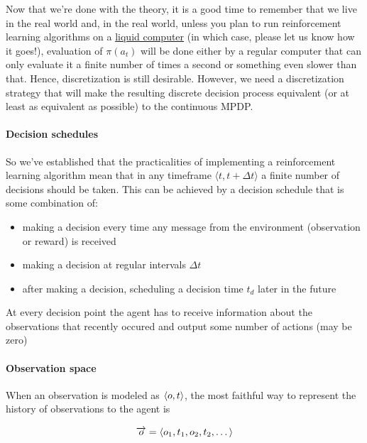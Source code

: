 Now that we're done with the theory, it is a good time to remember that
we live in the real world and, in the real world, unless you plan to run
reinforcement learning algorithms on a
\href{https://royalsocietypublishing.org/doi/10.1098/rstb.2018.0372}{liquid
computer} (in which case, please let us know how it goes!), evaluation
of $\pi(a_t)$ will be done
either by a regular computer that can only evaluate it a finite number
of times a second or something even slower than that. Hence,
discretization is still desirable. However, we need a discretization
strategy that will make the resulting discrete decision process
equivalent (or at least as equivalent as possible) to the continuous
MPDP.

\paragraph{Decision schedules}

So we've established that the practicalities of implementing a
reinforcement learning algorithm mean that in any timeframe
$\langle t, t + \Delta t \rangle$ a finite number of decisions should
be taken. This can be achieved by a decision schedule that is some
combination of:

\begin{itemize}
\item
  making a decision every time any message from the environment
  (observation or reward) is received
\item
  making a decision at regular intervals
  $\Delta t$
\item
  after making a decision, scheduling a decision time
  $t_d$ later in the future
\end{itemize}

At every decision point the agent has to receive information about the
observations that recently occured and output some number of actions
(may be zero)

\paragraph{Observation space}

When an observation is modeled as $\langle o, t \rangle$, the most faithful way to represent the history of observations to the agent is

\begin{equation} 
\overrightarrow{o} = \langle o_1, t_1, o_2, t_2, \dots \rangle 
\end{equation}

